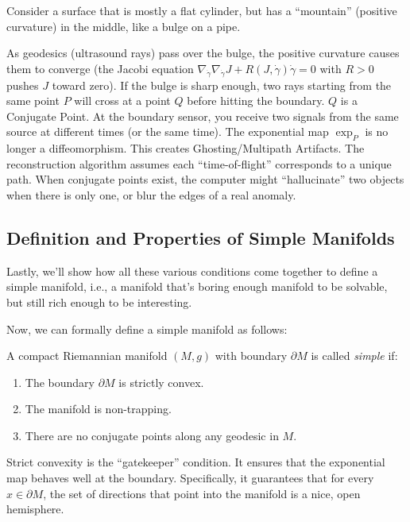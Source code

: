 \begin{example}
  Consider a surface that is mostly a flat cylinder, but has a ``mountain'' (positive curvature) in the middle, like a bulge on a pipe.

  As geodesics (ultrasound rays) pass over the bulge, the positive curvature causes them to converge (the Jacobi equation $\nabla_{\dot{\gamma}} \nabla_{\dot{\gamma}} J + R(J, \dot{\gamma})\dot{\gamma} = 0$ with $R > 0$ pushes $J$ toward zero). If the bulge is sharp enough, two rays starting from the same point $P$ will cross at a point $Q$ before hitting the boundary. $Q$ is a Conjugate Point. At the boundary sensor, you receive two signals from the same source at different times (or the same time). The exponential map $\exp_P$ is no longer a diffeomorphism. This creates Ghosting/Multipath Artifacts. The reconstruction algorithm assumes each ``time-of-flight'' corresponds to a unique path. When conjugate points exist, the computer might ``hallucinate'' two objects when there is only one, or blur the edges of a real anomaly.
\end{example}

\subsection{Definition and Properties of Simple Manifolds}
\label{sub_sec:definition_and_properties_of_simple_manifolds}
Lastly, we'll show how all these various conditions come together to define a simple manifold, i.e., a manifold that's boring enough manifold to be solvable, but still rich enough to be interesting.

Now, we can formally define a simple manifold as follows:
\begin{definition}
  A compact Riemannian manifold $(M, g)$ with boundary $\partial M$ is called \emph{simple} if:
  \begin{enumerate}
    \item The boundary $\partial M$ is strictly convex.
    \item The manifold is non-trapping.
    \item There are no conjugate points along any geodesic in $M$.
  \end{enumerate}
\end{definition}

Strict convexity is the ``gatekeeper'' condition. It ensures that the exponential map behaves well at the boundary. Specifically, it guarantees that for every $x \in \partial M$, the set of directions that point into the manifold is a nice, open hemisphere.

